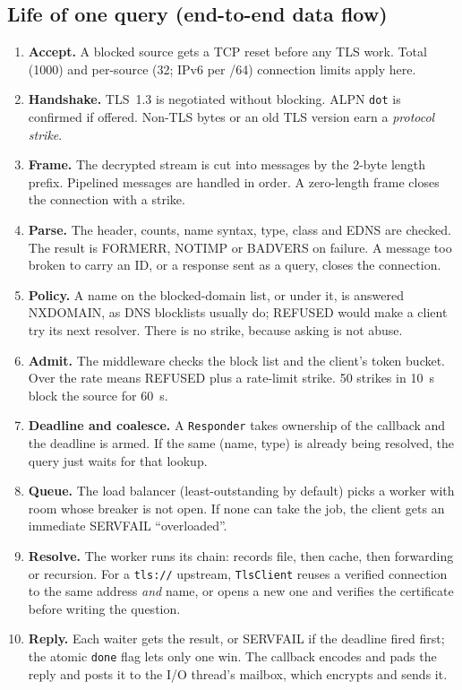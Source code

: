 \documentclass[11pt,a4paper]{article}
\newcommand{\code}[1]{\texttt{#1}}
\begin{document}
\subsection{Life of one query (end-to-end data flow)}
\begin{enumerate}
  \item \textbf{Accept.} A blocked source gets a TCP reset before any TLS work. Total (1000) and per-source
  (32; IPv6 per /64) connection limits apply here.
  \item \textbf{Handshake.} TLS~1.3 is negotiated without blocking. ALPN \code{dot} is confirmed if offered.
  Non-TLS bytes or an old TLS version earn a \emph{protocol strike}.
  \item \textbf{Frame.} The decrypted stream is cut into messages by the 2-byte length prefix. Pipelined
  messages are handled in order. A zero-length frame closes the connection with a strike.
  \item \textbf{Parse.} The header, counts, name syntax, type, class and EDNS are checked. The result is
  FORMERR, NOTIMP or BADVERS on failure. A message too broken to carry an ID, or a response sent as a query,
  closes the connection.
  \item \textbf{Policy.} A name on the blocked-domain list, or under it, is answered NXDOMAIN, as DNS blocklists
  usually do; REFUSED would make a client try its next resolver. There is no strike, because asking is not abuse.
  \item \textbf{Admit.} The middleware checks the block list and the client's token bucket. Over the rate means
  REFUSED plus a rate-limit strike. 50 strikes in 10~s block the source for 60~s.
  \item \textbf{Deadline and coalesce.} A \code{Responder} takes ownership of the callback and the deadline is
  armed. If the same (name, type) is already being resolved, the query just waits for that lookup.
  \item \textbf{Queue.} The load balancer (least-outstanding by default) picks a worker with room whose breaker
  is not open. If none can take the job, the client gets an immediate SERVFAIL ``overloaded''.
  \item \textbf{Resolve.} The worker runs its chain: records file, then cache, then forwarding or recursion.
  For a \code{tls://} upstream, \code{TlsClient} reuses a verified connection to the same address \emph{and}
  name, or opens a new one and verifies the certificate before writing the question.
  \item \textbf{Reply.} Each waiter gets the result, or SERVFAIL if the deadline fired first; the atomic
  \code{done} flag lets only one win. The callback encodes and pads the reply and posts it to the I/O thread's
  mailbox, which encrypts and sends it.
\end{enumerate}
\end{document}
